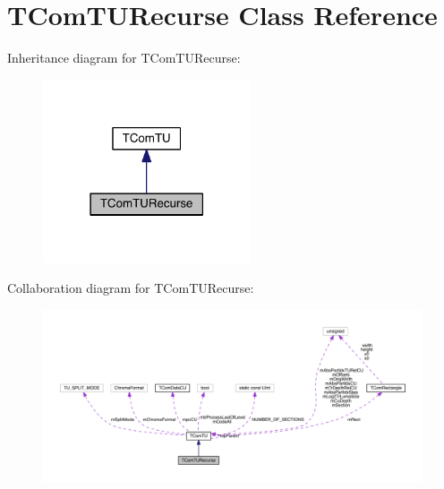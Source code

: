 \hypertarget{class_t_com_t_u_recurse}{}\section{T\+Com\+T\+U\+Recurse Class Reference}
\label{class_t_com_t_u_recurse}


Inheritance diagram for T\+Com\+T\+U\+Recurse\+:
\nopagebreak
\begin{figure}[H]
\begin{center}
\leavevmode
\includegraphics[width=174pt]{d7/db7/class_t_com_t_u_recurse__inherit__graph}
\end{center}
\end{figure}


Collaboration diagram for T\+Com\+T\+U\+Recurse\+:
\nopagebreak
\begin{figure}[H]
\begin{center}
\leavevmode
\includegraphics[width=350pt]{d6/df8/class_t_com_t_u_recurse__coll__graph}
\end{center}
\end{figure}
